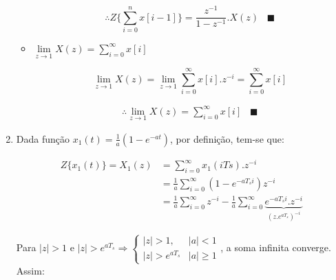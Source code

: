 \documentclass[twoside, fleqn]{article}
\begin{document}
\begin{enumerate}
\begin{itemize}
            	\begin{equation}
            	\therefore Z\{\sum_{i=0}^{n}x[i-1] \} = \frac{z^{-1}}{1-z^{-1}}.X(z) \hspace{10pt} \blacksquare
            	\end{equation}
            
            	\item $\lim\limits_{z \rightarrow 1} X(z) = \sum_{i=0}^{\infty}x[i]$
            
            	\begin{equation}
            	\lim\limits_{z \rightarrow 1} X(z) = \lim\limits_{z \rightarrow 1} \sum_{i=0}^{\infty} x[i].z^{-i} = \sum_{i=0}^{\infty} x[i]
            	\end{equation}
            	
            	\begin{equation}
            	\begin{split}
            	\therefore \lim\limits_{z \rightarrow 1} X(z) = \sum_{i=0}^{\infty}x[i] \hspace{10pt} \blacksquare
            	\end{split}
            	\end{equation}
            	
            \end{itemize}
        
        \item\label{item:ex2b} %
        
        Dada função $x_1(t) = \frac{1}{a} \left( 1 - e^{-at} \right)$, por definição, tem-se que:
        
        	\begin{equation}
            	\begin{split}
                	Z\{x_1(t)\} = X_1(z) & = \sum_{i=0}^{\infty} x_1(i Ts).z^{-i} \\
                	& = \frac{1}{a} \sum_{i=0}^{\infty} \left( 1 - e^{-a T_s i} \right)z^{-i} \\
                	& = \frac{1}{a} \sum_{i=0}^{\infty} z^{-i} - \frac{1}{a} \sum_{i=0}^{\infty} \underbrace{e^{-a T_s i}.z^{-i}}_{(z.e^{aT_s})^{-i}}
            	\end{split}
        	\end{equation}
        
        Para $|z| > 1$ e $|z| > e^{aT_s} \Rightarrow \begin{cases} |z| > 1, & |a| < 1 \\ |z| > e^{a T_s} & |a| \geq 1 \end{cases}$, a soma infinita converge. Assim:
        	

\end{enumerate}
\end{document}
